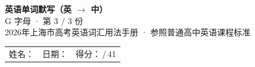 \documentclass[10pt,a4paper]{article}
\begin{document}
\pagestyle{plain}

\begin{center}
{\LARGE\bfseries 英语单词默写（英 $\to$ 中）}\\[0.22em]
{\large G 字母 · 第 3 / 3 份}\\[0.18em]
{\small 2026年上海市高考英语词汇用法手册 · 参照普通高中英语课程标准}
\end{center}

\vspace{0.25em}
\noindent\begin{tabular}{@{}p{}@{}p{}@{}p{}@{}}
姓名：\underline{\hspace{2.0cm}} & 日期：\underline{\hspace{2.0cm}} & 得分：\underline{\hspace{1.3cm}}\,/\,41 \\
\end{tabular}

\vspace{0.3em}

\vspace{0.08em}
\end{document}
